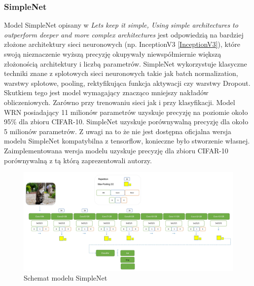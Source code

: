 \documentclass[
    left=2.5cm,         %
    right=2.5cm,        %
    top=2.5cm,          %
    bottom=3cm,         %
    bindingoffset=6mm,  %
    nohyphenation=false %
]{eiti/eiti-thesis}
\begin{document}
        \subsubsection{SimpleNet}
        Model SimpleNet opisany w
        \textit{Lets keep it simple, Using simple architectures to outperform deeper and more complex architectures}\cite{DBLP:journals/corr/HasanPourRVS16}
        jest odpowiedzią na bardziej złożone
        architektury sieci neuronowych (np. InceptionV3 \ref{InceptionV3}), które swoją nieznaczenie wyższą precyzję
        okupywały niewspółmiernie większą złożonością architektury i liczbą parametrów. SimpleNet wykorzystuje klasyczne
        techniki znane z splotowych sieci neuronowych takie jak batch normalization, warstwy splotowe, pooling,
        rektyfikująca funkcja aktywacji czy warstwy Dropout. Skutkiem tego jest model wymagający znacząco mniejszy nakładów
        obliczeniowych. Zarówno przy trenowaniu sieci jak i przy klasyfikacji. Model WRN\cite{DBLP:journals/corr/ZagoruykoK16}
        posiadający 11 milionów parametrów uzyskuje precyzję na poziomie około 95\% dla zbioru CIFAR-10.
        SimpleNet uzyskuje porównywalną precyzję dla około 5 milionów parametrów. Z uwagi na to że nie jest dostępna oficjalna
        wersja modelu SimpleNet kompatybilna z tensorflow, konieczne było stworzenie własnej. Zaimplementowana wersja modelu
        uzyskuje precyzję dla zbioru CIFAR-10 porównywalną z tą którą zaprezentowali autorzy.
        \begin{figure}[H]
            \centring
            \includegraphics[width=\textwidth]{eiti/simplenet_overview.jpg}
            \caption{Schemat modelu SimpleNet}
        \end{figure}
\end{document}
